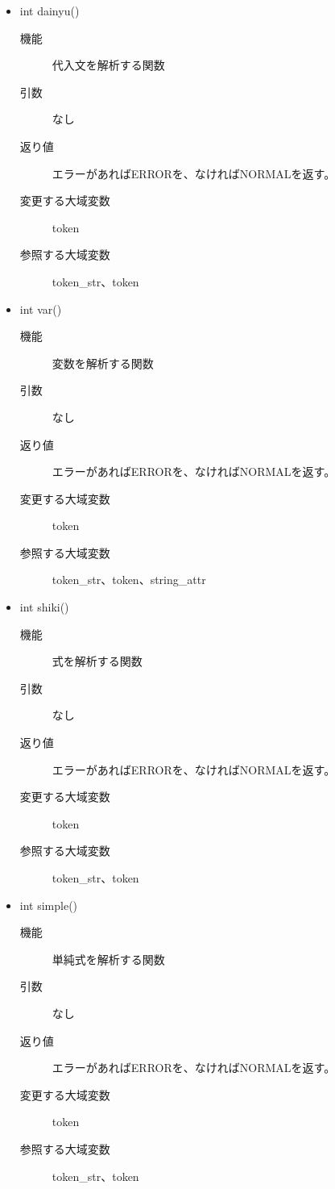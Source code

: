 \documentclass{jarticle}
\begin{document}
\begin{itemize}
\begin{description}
\item[機能]式の並びを解析する関数
\item[引数]なし
\item[返り値]エラーがあればERRORを、なければNORMALを返す。
\item[変更する大域変数]token
\item[参照する大域変数]token\_str、token
\end{description}
\item int dainyu()
\begin{description}
\item[機能]代入文を解析する関数
\item[引数]なし
\item[返り値]エラーがあればERRORを、なければNORMALを返す。
\item[変更する大域変数]token
\item[参照する大域変数]token\_str、token
\end{description}
\item int var()
\begin{description}
\item[機能]変数を解析する関数
\item[引数]なし
\item[返り値]エラーがあればERRORを、なければNORMALを返す。
\item[変更する大域変数]token
\item[参照する大域変数]token\_str、token、string\_attr
\end{description}
\item int shiki()
\begin{description}
\item[機能]式を解析する関数
\item[引数]なし
\item[返り値]エラーがあればERRORを、なければNORMALを返す。
\item[変更する大域変数]token
\item[参照する大域変数]token\_str、token
\end{description}
\item int simple()
\begin{description}
\item[機能]単純式を解析する関数
\item[引数]なし
\item[返り値]エラーがあればERRORを、なければNORMALを返す。
\item[変更する大域変数]token
\item[参照する大域変数]token\_str、token
\end{description}

\end{itemize}
\end{document}
